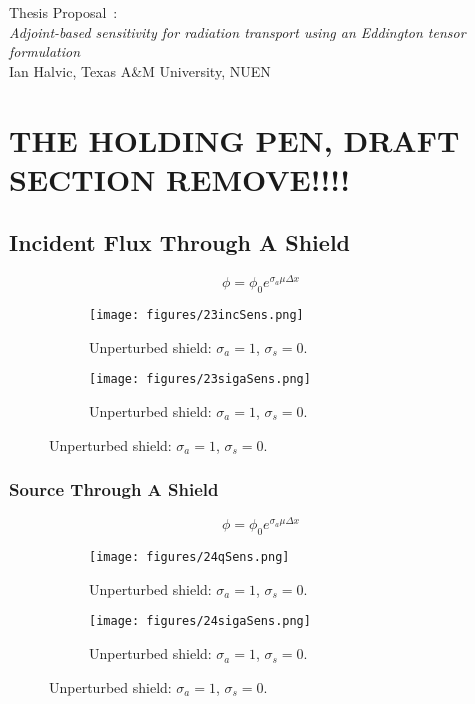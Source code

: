\documentclass{article}
\newcommand{\sigs}{\sigma_s}
\newcommand{\siga}{\sigma_a}
\begin{document}
\begin{center}
{\large Thesis Proposal~:\\
{\it Adjoint-based sensitivity for radiation transport using an Eddington tensor formulation}}\\
\vspace{2mm}
Ian Halvic, Texas A\&M University, NUEN
\end{center}

\tableofcontents
\newpage
\section{THE HOLDING PEN, DRAFT SECTION REMOVE!!!!}

\subsection{Incident Flux Through A Shield}
\begin{equation}
\phi = \phi_0 e^{\sigma_a \mu \Delta x}
\end{equation}
\begin{figure}[H]
\label{Absorber}
\centering
\begin{subfigure}{.5\textwidth}
  \centering
  \texttt{[image: figures/23incSens.png]}
  \caption{Unperturbed shield: $\siga=1$, $\sigs=0$. }
  \label{fig:sfig1}
\end{subfigure}%
\begin{subfigure}{.5\textwidth}
  \centering
  \texttt{[image: figures/23sigaSens.png]}
  \caption{Unperturbed shield: $\siga=1$, $\sigs=0$. }
  \label{fig:sfig2}
\end{subfigure}
\end{figure}

\subsubsection{Source Through A Shield}
\begin{equation}
\phi = \phi_0 e^{\sigma_a \mu \Delta x}
\end{equation}

\begin{figure}[H]
\label{Absorber}
\centering
\begin{subfigure}{.5\textwidth}
  \centering
  \texttt{[image: figures/24qSens.png]}
  \caption{Unperturbed shield: $\siga=1$, $\sigs=0$. }
  \label{fig:sfig1}
\end{subfigure}%
\begin{subfigure}{.5\textwidth}
  \centering
  \texttt{[image: figures/24sigaSens.png]}
  \caption{Unperturbed shield: $\siga=1$, $\sigs=0$. }
  \label{fig:sfig2}
\end{subfigure}
\end{figure}
\end{document}
